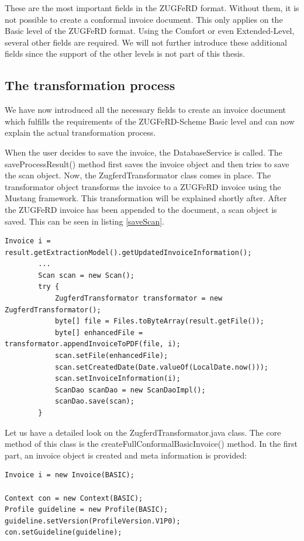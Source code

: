These are the most important fields in the ZUGFeRD format. Without them, it is not possible to create a conformal invoice document. This only applies on the Basic level of the ZUGFeRD format. Using the Comfort or even Extended-Level, several other fields are required. We will not further introduce these additional fields since the support of the other levels is not part of this thesis. 

\subsection{The transformation process}
\label{sec5.7.2}

We have now introduced all the necessary fields to create an invoice document which fulfills the requirements of the ZUGFeRD-Scheme Basic level and can now explain the actual transformation process. 

When the user decides to save the invoice, the DatabaseService is called. The saveProcessResult() method first saves the invoice object and then tries to save the scan object. Now, the ZugferdTransformator class comes in place. The transformator object transforms the invoice to a ZUGFeRD invoice using the Mustang framework. This transformation will be explained shortly after. After the ZUGFeRD invoice has been appended to the document, a scan object is saved. This can be seen in listing \ref{saveScan}.

\begin{lstlisting}[caption={}, label={saveScan}]
        Invoice i = result.getExtractionModel().getUpdatedInvoiceInformation();
        ...
        Scan scan = new Scan();
        try {
            ZugferdTransformator transformator = new ZugferdTransformator();
            byte[] file = Files.toByteArray(result.getFile());
            byte[] enhancedFile = transformator.appendInvoiceToPDF(file, i);
            scan.setFile(enhancedFile);
            scan.setCreatedDate(Date.valueOf(LocalDate.now()));
            scan.setInvoiceInformation(i);
            ScanDao scanDao = new ScanDaoImpl();
            scanDao.save(scan);
        }
\end{lstlisting}

Let us have a detailed look on the ZugferdTransformator.java class. The core method of this class is the createFullConformalBasicInvoice() method. 
In the first part, an invoice object is created and meta information is provided:

\begin{lstlisting}[caption={Creation of the invoice object}]
Invoice i = new Invoice(BASIC);

Context con = new Context(BASIC);
Profile guideline = new Profile(BASIC);
guideline.setVersion(ProfileVersion.V1P0);
con.setGuideline(guideline);
\end{lstlisting}

